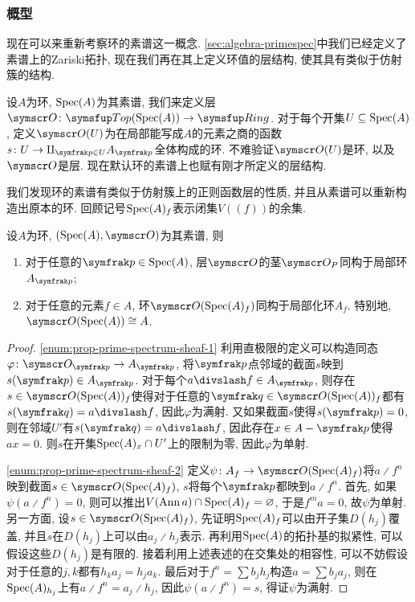 \subsubsection{概型}

现在可以来重新考察环的素谱这一概念. \ref{sec:algebra-primespec}中我们已经定义了素谱上的Zariski拓扑, 现在我们再在其上定义环值的层结构, 使其具有类似于仿射簇的结构.

设$A$为环, $\operatorname{Spec} (A)$为其素谱, 我们来定义层$\sheaf{O}\colon \cat{Top}(\Spec (A))\to \cat{Ring}$. 对于每个开集$U\subseteq \operatorname{Spec} (A)$, 定义$\sheaf{O}(U)$为在局部能写成$A$的元素之商的函数$s\colon U\to \amalg_{\ideal{p}\in U}A_{\ideal{p}}$全体构成的环. 不难验证$\sheaf{O}(U)$是环, 以及$\sheaf{O}$是层. 现在默认环的素谱上也赋有刚才所定义的层结构.

我们发现环的素谱有类似于仿射簇上的正则函数层的性质, 并且从素谱可以重新构造出原本的环. 回顾记号$\operatorname{Spec}(A)_{f}$表示闭集$V((f))$的余集.

\begin{proposition}\label{prop:primespectrumsheaf}
  设$A$为环, $(\Spec (A), \OO)$为其素谱, 则
  \begin{enumerate}
    \item\label{enum:prop-prime-spectrum-sheaf-1} 对于任意的$\ideal{p}\in\Spec (A)$, 层$\OO$的茎$\OO_P$同构于局部环$A_{\ideal{p}}$;
    \item\label{enum:prop-prime-spectrum-sheaf-2} 对于任意的元素$f\in A$, 环$\OO(\Spec (A)_f)$同构于局部化环$A_f$. 特别地, $\OO (\Spec (A))\cong A$.
  \end{enumerate}
\end{proposition}

\begin{proof}
  \ref{enum:prop-prime-spectrum-sheaf-1} 利用直极限的定义可以构造同态$\varphi\colon \OO_{\ideal{p}}\to A_{\ideal{p}}$, 将$\ideal{p}$点邻域的截面$s$映到$s(\ideal{p})\in A_{\ideal{p}}$. 对于每个$a{\divslash}f\in A_{\ideal{p}}$, 则存在$s\in\OO (\Spec (A))_f$使得对于任意的$\ideal{q}\in \OO (\Spec (A))_f$都有$s(\ideal{q})=a{\divslash}f$, 因此$\varphi$为满射. 又如果截面$s$使得$s(\ideal{p})=0$, 则在邻域$U'$有$s(\ideal{q})=a{\divslash}f$, 因此存在$x\in A-\ideal{p}$使得$ax=0$. 则$s$在开集$\operatorname{Spec} (A)_x\cap U'$上的限制为零, 因此$\varphi$为单射.

  \ref{enum:prop-prime-spectrum-sheaf-2} 定义$\psi\colon A_f\to \OO (\Spec (A)_f)$将$a{\divslash}f^n$映到截面$s\in \OO (\Spec (A)_f)$, $s$将每个$\ideal{p}$都映到$a{\divslash}f^n$. 首先, 如果$\psi(a{\divslash}f^n)=0$, 则可以推出$V(\operatorname{Ann} a)\cap \operatorname{Spec} (A)_f=\varnothing$, 于是$f^ma=0$, 故$\psi$为单射. 另一方面, 设$s\in \OO (\Spec (A)_f)$, 先证明$\operatorname{Spec} (A)_f$可以由开子集$D(h_j)$覆盖, 并且$s$在$D(h_j)$上可以由$a_j{\divslash}h_j$表示. 再利用$\operatorname{Spec} (A)$的拓扑基的拟紧性, 可以假设这些$D(h_j)$是有限的. 接着利用上述表述的在交集处的相容性, 可以不妨假设对于任意的$j,k$都有$h_ka_j=h_ja_k$. 最后对于$f^n=\sum b_jh_j$构造$a=\sum b_ja_j$, 则在$\operatorname{Spec} (A)_{h_j}$上有$a{\divslash}f^n=a_j{\divslash}h_j$, 因此$\psi (a{\divslash}f^n)=s$, 得证$\psi$为满射.
\end{proof}

